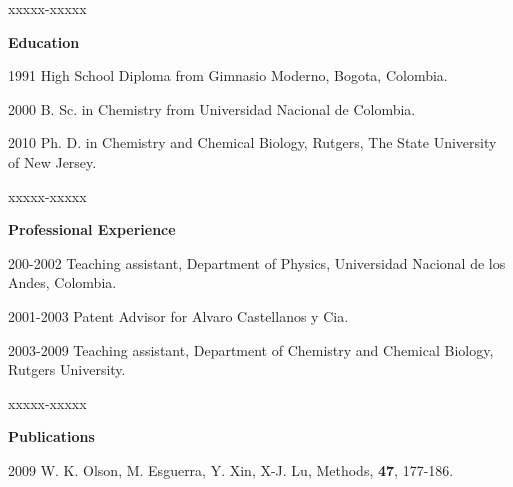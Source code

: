 \begin{vita}
 \vspace{15pt}
\begin{descriptionlist}{xxxxx-xxxxx} %
\item[{\bf Education}] \mbox{}
\item[1991] High School Diploma from Gimnasio Moderno, Bogota, Colombia.
\item[2000] B. Sc. in Chemistry from Universidad Nacional de Colombia.
\item[2010]  Ph. D. in  Chemistry and  Chemical Biology,  Rutgers, The
  State University of New Jersey.
\end{descriptionlist}
\medskip
\begin{descriptionlist}{xxxxx-xxxxx} %
\item[{\bf Professional Experience}] \mbox{}
\item[200-2002] Teaching assistant, Department of Physics, Universidad
  Nacional de los Andes, Colombia.
\item[2001-2003] Patent Advisor for Alvaro Castellanos y Cia.
\item[2003-2009] Teaching assistant, Department of Chemistry and
  Chemical Biology, Rutgers University.
\end{descriptionlist}
\medskip
\begin{descriptionlist}{xxxxx-xxxxx} %
\item[{\bf Publications}] \mbox{}
\item[2009]  W. K.  Olson,  M.  Esguerra, Y.  Xin,  X-J. Lu,  Methods,
  \textbf{47}, 177-186.
\end{descriptionlist}

\end{vita} 



